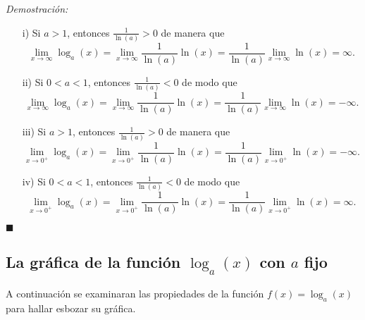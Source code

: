 \documentclass[pts12]{article}
\numberwithin{equation}{section}
\newcommand{\Col}{\color{ProcessBlue}}
\newcommand{\limit}[2]{\lim_{#1\to #2}}
\begin{document}
\textit{Demostración:}

\begin{enumerate}
\item[i)] Si $a>1$, entonces $\frac{1}{\ln(a)}>0$ de manera que 
$$ \limit{x}{\infty}\log_a(x)=\limit{x}{\infty}\frac{1}{\ln(a)}\ln(x)=\frac{1}{\ln(a)}\limit{x}{\infty}\ln(x)=\infty. $$
\item[ii)] Si $0<a<1$, entonces $\frac{1}{\ln(a)}<0$ de modo que 
$$ \limit{x}{\infty}\log_a(x)=\limit{x}{\infty}\frac{1}{\ln(a)}\ln(x)=\frac{1}{\ln(a)}\limit{x}{\infty}\ln(x)=-\infty. $$
\item[iii)] Si $a>1$, entonces $\frac{1}{\ln(a)}>0$ de manera que 
$$ \limit{x}{0^+}\log_a(x)=\limit{x}{0^+}\frac{1}{\ln(a)}\ln(x)=\frac{1}{\ln(a)}\limit{x}{0^+}\ln(x)=-\infty .$$
\item[iv)] Si $0<a<1$, entonces $\frac{1}{\ln(a)}<0$ de modo que 
$$ \limit{x}{0^+}\log_a(x)=\limit{x}{0^+}\frac{1}{\ln(a)}\ln(x)=\frac{1}{\ln(a)}\limit{x}{0^+}\ln(x)=\infty .$$
\end{enumerate}

\begin{flushright}
$\blacksquare$
\end{flushright}

\subsection{\Col La gráfica de la función $\log_a(x)$ con $a$ fijo}

A continuación se examinaran las propiedades de la función $f(x)=\log_a(x)$ para hallar esbozar su gráfica.

\end{document}

